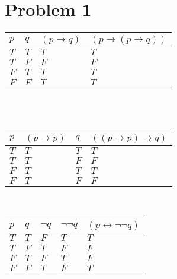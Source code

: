 \documentclass{article}%
\begin{document}
\section*{Problem 1}

\begin{tabular}{l | l | l | l |}
    $p$ & $q$ & $(p \rightarrow q)$ & $(p \rightarrow (p \rightarrow q))$ \\ \hline
    $T$ & $T$ & $T$                 & $T$ \\ \hline
    $T$ & $F$ & $F$                 & $F$ \\ \hline
    $F$ & $T$ & $T$                 & $T$ \\ \hline
    $F$ & $F$ & $T$                 & $T$ \\ \hline
\end{tabular}\\
\\
\vspace{3mm}

\noindent
\begin{tabular}{l | l | l | l |}
    $p$ & $(p \rightarrow p)$   & $q$ & $((p \rightarrow p) \rightarrow q)$ \\ \hline
    $T$ & $T$                   & $T$ & $T$ \\ \hline
    $T$ & $T$                   & $F$ & $F$ \\ \hline
    $F$ & $T$                   & $T$ & $T$ \\ \hline
    $F$ & $T$                   & $F$ & $F$ \\ \hline
\end{tabular}
\\
\vspace{3mm}

\noindent
\begin{tabular}{l | l | l | l | l |}
    $p$ & $q$ & $\neg q$    & $\neg \neg q$ & $(p \leftrightarrow \neg \neg q)$ \\ \hline
    $T$ & $T$ & $F$         & $T$           & $T$ \\ \hline
    $T$ & $F$ & $T$         & $F$           & $F$ \\ \hline
    $F$ & $T$ & $F$         & $T$           & $F$ \\ \hline
    $F$ & $F$ & $T$         & $F$           & $T$ \\ \hline
\end{tabular}
\\
\vspace{3mm}
\end{document}
